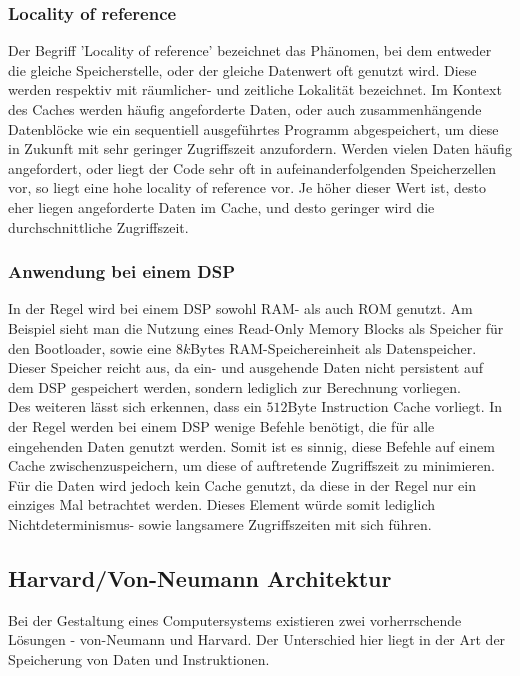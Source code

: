 \subsubsection{Locality of reference}
Der Begriff 'Locality of reference' bezeichnet das Phänomen, bei dem entweder die gleiche Speicherstelle, oder der gleiche Datenwert oft genutzt wird. Diese werden respektiv mit räumlicher- und zeitliche Lokalität bezeichnet. Im Kontext des Caches werden häufig angeforderte Daten, oder auch zusammenhängende Datenblöcke wie ein sequentiell ausgeführtes Programm abgespeichert, um diese in Zukunft mit sehr geringer Zugriffszeit anzufordern. Werden vielen Daten häufig angefordert, oder liegt der Code sehr oft in aufeinanderfolgenden Speicherzellen vor, so liegt eine hohe locality of reference vor. Je höher dieser Wert ist, desto eher liegen angeforderte Daten im Cache, und desto geringer wird die durchschnittliche Zugriffszeit.

\subsubsection{Anwendung bei einem DSP}
In der Regel wird bei einem DSP sowohl RAM- als auch ROM genutzt. Am Beispiel \cite{TI} sieht man die Nutzung eines Read-Only Memory Blocks als Speicher für den Bootloader, sowie eine $8k$Bytes RAM-Speichereinheit als Datenspeicher. Dieser Speicher reicht aus, da ein- und ausgehende Daten nicht persistent auf dem DSP gespeichert werden, sondern lediglich zur Berechnung vorliegen.\\
Des weiteren lässt sich erkennen, dass ein $512$Byte Instruction Cache vorliegt. In der Regel werden bei einem DSP wenige Befehle benötigt, die für alle eingehenden Daten genutzt werden. Somit ist es sinnig, diese Befehle auf einem Cache zwischenzuspeichern, um diese of auftretende Zugriffszeit zu minimieren.\\
Für die Daten wird jedoch kein Cache genutzt, da diese in der Regel nur ein einziges Mal betrachtet werden. Dieses Element würde somit lediglich Nichtdeterminismus- sowie langsamere Zugriffszeiten mit sich führen. 


\subsection{Harvard/Von-Neumann Architektur}\label{2.3}
Bei der Gestaltung eines Computersystems existieren zwei vorherrschende Lösungen - von-Neumann und Harvard. Der Unterschied hier liegt in der Art der Speicherung von Daten und Instruktionen.

